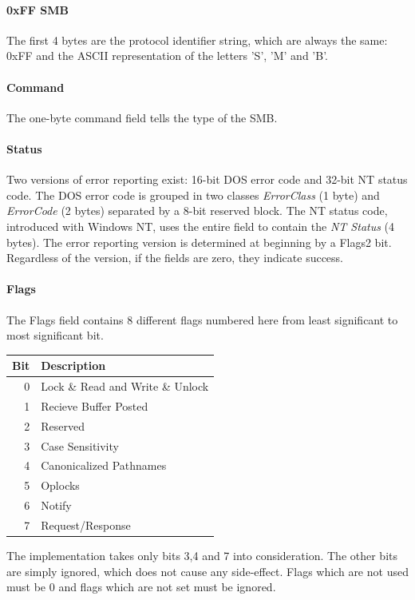 \documentclass[11pt,a4paper]{book}
\begin{document}
\paragraph{0xFF SMB} The first 4 bytes are the protocol identifier string, which are always the same: 0xFF and the ASCII representation of the letters 'S', 'M' and 'B'.

\paragraph{Command} The one-byte command field tells the type of the SMB.

\paragraph{Status} Two versions of error reporting exist: 16-bit DOS error code and 32-bit NT status code. The DOS error code is grouped in two classes \textit{ErrorClass} (1 byte) and \textit{ErrorCode} (2 bytes) separated by a 8-bit reserved block. The NT status code, introduced with Windows NT, uses the entire field to contain the \textit{NT Status} (4 bytes). The error reporting version is determined at beginning by a Flags2 bit. Regardless of the version, if the fields are zero, they indicate success.

\paragraph{Flags} The Flags field contains 8 different flags numbered here from least significant to most significant bit.
\begin{center}
	\begin{tabular}{r|l}
		Bit & Description \\ 
		\hline
		0 & Lock \& Read and Write \& Unlock \\
		1 & Recieve Buffer Posted \\
		2 & Reserved \\	
		3 & Case Sensitivity \\
		4 & Canonicalized Pathnames \\
		5 & Oplocks \\
		6 & Notify \\
		7 & Request/Response \\
	\end{tabular}
\end{center}
The implementation takes only bits 3,4 and 7 into consideration. The other bits are simply ignored, which does not cause any side-effect. Flags which are not used must be 0 and flags which are not set must be ignored.
\end{document}
